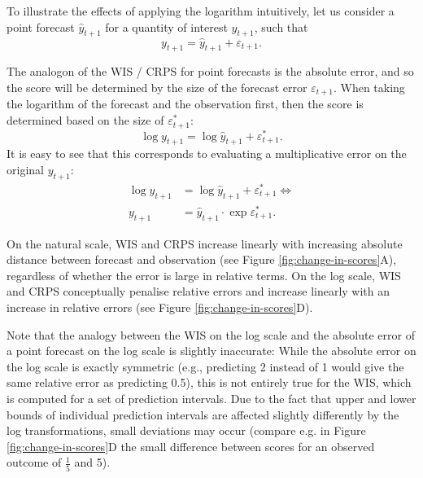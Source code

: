 \documentclass{article}
\begin{document}
To illustrate the effects of applying the logarithm intuitively, let us consider a point forecast $\hat{y}_{t+1}$ for a quantity of interest $y_{t+1}$, such that 
\begin{equation}
y_{t+1} = \hat{y}_{t+1} + \varepsilon_{t+1}.
\end{equation}

The analogon of the WIS / CRPS for point forecasts is the absolute error, and so the score will be determined by the size of the forecast error $\varepsilon_{t+1}$. When taking the logarithm of the forecast and the observation first, then the score is determined based on the size of $\varepsilon^*_{t+1}$: 
\begin{equation}
\log y_{t+1} = \log \hat{y}_{t+1} + \varepsilon^*_{t+1}.
\end{equation}
%
It is easy to see that this corresponds to evaluating a multiplicative error on the original $y_{t+1}$:
%
\begin{align}
\log y_{t+1} &= \log \hat{y}_{t+1} + \varepsilon^*_{t+1} \Leftrightarrow \\    
y_{t+1} &= \hat{y}_{t+1} \cdot \exp{\varepsilon^*_{t+1}}.    
\end{align}

On the natural scale, WIS and CRPS increase linearly with increasing absolute distance between forecast and observation (see Figure \ref{fig:change-in-scores}A), regardless of whether the error is large in relative terms. On the log scale, WIS and CRPS conceptually penalise relative errors and increase linearly with an increase in relative errors (see Figure \ref{fig:change-in-scores}D). 

Note that the analogy between the WIS on the log scale and the absolute error of a point forecast on the log scale is slightly inaccurate: While the absolute error on the log scale is exactly symmetric (e.g., predicting 2 instead of 1 would give the same relative error as predicting 0.5), this is not entirely true for the WIS, which is computed for a set of prediction intervals. Due to the fact that upper and lower bounds of individual prediction intervals are affected slightly differently by the log transformations, small deviations may occur (compare e.g. in Figure \ref{fig:change-in-scores}D the small difference between scores for an observed outcome of $\frac{1}{5}$ and 5). 
\end{document}
